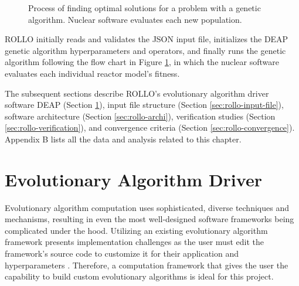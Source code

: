 \begin{figure}[htbp]
    \caption{Process of finding optimal solutions for a problem with a 
    genetic algorithm. Nuclear software evaluates each new population.}
    \label{fig:genetic_alg_nuclear}
\end{figure}
\gls{ROLLO} initially reads and validates the JSON input 
file, initializes the \gls{DEAP} \cite{fortin_deap_2012} genetic algorithm 
hyperparameters and operators, and finally runs the genetic algorithm following 
the flow chart in Figure \ref{fig:genetic_alg_nuclear}, in which the nuclear 
software evaluates each individual reactor model's fitness. 

The subsequent sections describe \gls{ROLLO}'s evolutionary algorithm driver 
software \gls{DEAP} (Section \ref{sec:rollo-ea}), input file structure (Section 
\ref{sec:rollo-input-file}), software architecture (Section \ref{sec:rollo-archi}), 
verification studies (Section \ref{sec:rollo-verification}), and convergence criteria
(Section \ref{sec:rollo-convergence}). 
Appendix B lists all the data and analysis related to this chapter.

\section{Evolutionary Algorithm Driver}
\label{sec:rollo-ea}
Evolutionary algorithm computation uses sophisticated, diverse techniques 
and mechanisms, resulting in even the most well-designed software frameworks 
being complicated under the hood. 
Utilizing an existing evolutionary algorithm framework presents implementation 
challenges as the user must edit the framework's source code to customize it for their 
application and hyperparameters \cite{fortin_deap_2012}. 
Therefore, a computation framework that gives the user the capability to build 
custom evolutionary algorithms is ideal for this project.

